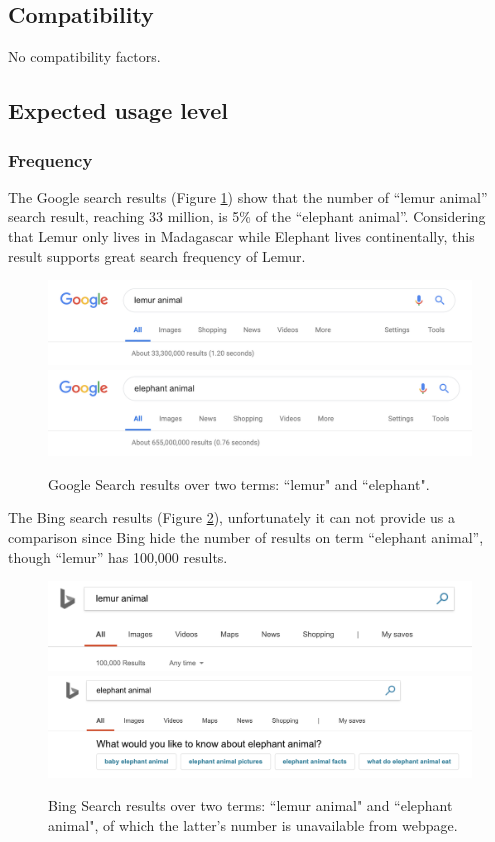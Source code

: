 \documentclass{article}
\begin{document}
\subsection{Compatibility}
No compatibility factors.

\subsection{Expected usage level}
\subsubsection{Frequency}

The Google search results (Figure \ref{fig:google-search}) show that the number of ``lemur animal'' search result, reaching 33 million, is 5\% of the ``elephant animal''. Considering that Lemur only lives in Madagascar while Elephant lives continentally, this result supports great search frequency of Lemur.
\begin{figure}[h]
  \includegraphics[width=\linewidth]{img/google-search-lemur-animal.png}
  \includegraphics[width=\linewidth]{img/google-search-elephant-animal.png}
  \caption{Google Search results over two terms: ``lemur" and ``elephant".}
  \label{fig:google-search}
\end{figure}

The Bing search results (Figure \ref{fig:bing-search}), unfortunately it can not provide us a comparison since Bing hide the number of results on term ``elephant animal'', though ``lemur'' has 100,000 results.

\begin{figure}[h]
  \includegraphics[width=\linewidth]{img/bing-lemur-animal.png}
  \includegraphics[width=\linewidth]{img/bing-elephant-animal.png}
  \caption{Bing Search results over two terms: ``lemur animal" and ``elephant animal", of which the latter's number is unavailable from webpage.}
  \label{fig:bing-search}
\end{figure}
\end{document}
